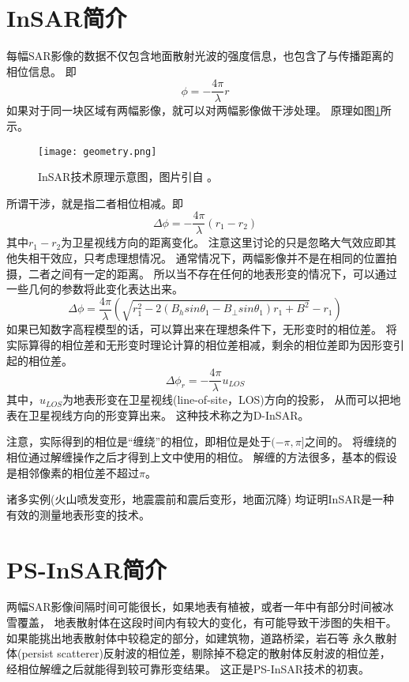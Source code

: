 \section{InSAR简介}
每幅SAR影像的数据不仅包含地面散射光波的强度信息，也包含了与传播距离的相位信息。
即
\begin{equation}
    \phi=-\frac{4\pi}{\lambda}r
\end{equation}
如果对于同一块区域有两幅影像，就可以对两幅影像做干涉处理。
原理如图\ref{fig:geometry}所示。
\begin{figure}[htb]
    \centering
    \texttt{[image: geometry.png]}
    \caption{InSAR技术原理示意图，图片引自
    。}
    \label{fig:geometry}
\end{figure}
所谓干涉，就是指二者相位相减。即
\begin{equation}
    \Delta \phi=-\frac{4\pi}{\lambda}(r_1-r_2)
\end{equation}
其中$r_1-r_2$为卫星视线方向的距离变化。
注意这里讨论的只是忽略大气效应即其他失相干效应，只考虑理想情况。
通常情况下，两幅影像并不是在相同的位置拍摄，二者之间有一定的距离。
所以当不存在任何的地表形变的情况下，可以通过一些几何的参数将此变化表达出来。
\begin{equation}
    \Delta \phi=\frac{4\pi}{\lambda}\left(\sqrt{r_1^2−2(B_hsinθ_1−B_{\perp}sinθ_1)r_1+B^2}−r_1\right)
\end{equation}
如果已知数字高程模型的话，可以算出来在理想条件下，无形变时的相位差。
将实际算得的相位差和无形变时理论计算的相位差相减，剩余的相位差即为因形变引起的相位差。
\begin{equation}
    \Delta \phi_{r}=-\frac{4\pi}{\lambda}u_{LOS}
\end{equation}
其中，$u_{LOS}$为地表形变在卫星视线(line-of-site，LOS)方向的投影，
从而可以把地表在卫星视线方向的形变算出来。
这种技术称之为D-InSAR。

注意，实际得到的相位是“缠绕”的相位，即相位是处于$(-\pi,\pi]$之间的。
将缠绕的相位通过解缠操作之后才得到上文中使用的相位。
解缠的方法很多，基本的假设是相邻像素的相位差不超过$\pi$。

诸多实例(火山喷发变形，地震震前和震后变形，地面沉降)
均证明InSAR是一种有效的测量地表形变的技术。

\section{PS-InSAR简介}
两幅SAR影像间隔时间可能很长，如果地表有植被，或者一年中有部分时间被冰雪覆盖，
地表散射体在这段时间内有较大的变化，有可能导致干涉图的失相干。
如果能挑出地表散射体中较稳定的部分，如建筑物，道路桥梁，岩石等
永久散射体(persist scatterer)反射波的相位差，剔除掉不稳定的散射体反射波的相位差，
经相位解缠之后就能得到较可靠形变结果。
这正是PS-InSAR技术的初衷。

